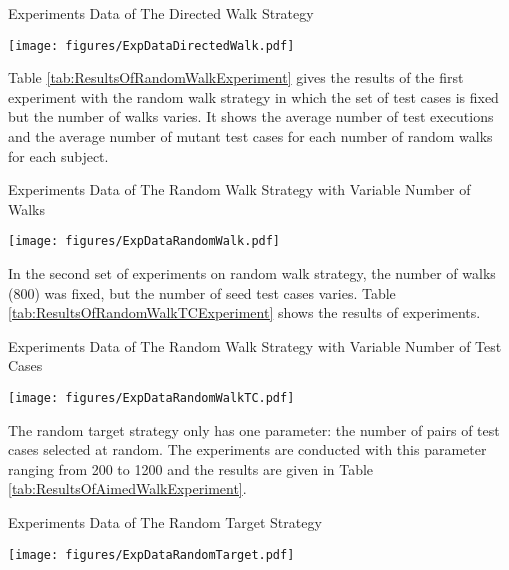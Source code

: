 \documentclass[preprint,1p,authoryear,times]{elsarticle}
\begin{document}
\begin{table}[htbp]
\caption{Experiments Data of The Directed Walk Strategy} 
\label{tab:ResultsOfDirectedWalkExperiment}
\begin{center}
\texttt{[image: figures/ExpDataDirectedWalk.pdf]}
\end{center}
\end{table}

Table \ref{tab:ResultsOfRandomWalkExperiment} gives the results of the first experiment with the random walk strategy in which the set of test cases is fixed but the number of walks varies. It shows the average number of test executions and the average number of mutant test cases for each number of random walks for each subject. 	

\begin{table}[htbp]
\caption{Experiments Data of The Random Walk Strategy with Variable Number of Walks} 
\label{tab:ResultsOfRandomWalkExperiment}
\begin{center}
\texttt{[image: figures/ExpDataRandomWalk.pdf]}
\end{center}
\end{table}

In the second set of experiments on random walk strategy, the number of walks (800) was fixed, but the number of seed test cases varies. Table \ref{tab:ResultsOfRandomWalkTCExperiment} shows the results of experiments. 

\begin{table}[htbp]
\caption{Experiments Data of The Random Walk Strategy with Variable Number of Test Cases} 
\label{tab:ResultsOfRandomWalkTCExperiment}
\begin{center}
\texttt{[image: figures/ExpDataRandomWalkTC.pdf]}
\end{center}
\end{table}

The random target strategy only has one parameter: the number of pairs of test cases selected at random. The experiments are conducted with this parameter ranging from 200 to 1200 and the results are given in Table \ref{tab:ResultsOfAimedWalkExperiment}. 

\begin{table}[htbp]
\caption{Experiments Data of The Random Target Strategy} 
\label{tab:ResultsOfAimedWalkExperiment}
\begin{center}
\texttt{[image: figures/ExpDataRandomTarget.pdf]}
\end{center}
\end{table}
\end{document}
